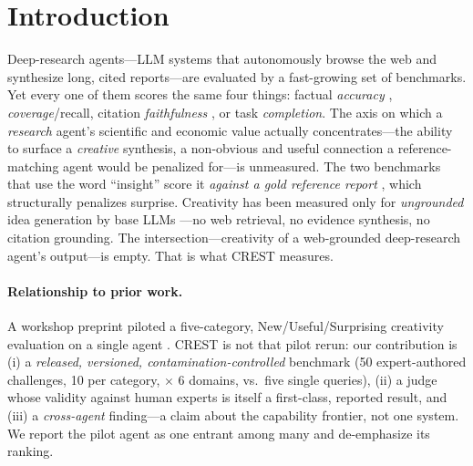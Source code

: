 \section{Introduction}

Deep-research agents---LLM systems that autonomously browse the web and synthesize long, cited reports---are evaluated by a fast-growing set of benchmarks. Yet every one of them scores the same four things: factual \emph{accuracy} \citep{mialon2023gaia,wei2025browsecomp}, \emph{coverage}/recall, citation \emph{faithfulness} \citep{du2025deepresearchbench}, or task \emph{completion}. The axis on which a \emph{research} agent's scientific and economic value actually concentrates---the ability to surface a \emph{creative} synthesis, a non-obvious and useful connection a reference-matching agent would be penalized for---is unmeasured. The two benchmarks that use the word ``insight'' score it \emph{against a gold reference report} \citep{du2025deepresearchbench,researcherbench2025}, which structurally penalizes surprise. Creativity has been measured only for \emph{ungrounded} idea generation by base LLMs \citep{si2024novel,ruan2024liveideabench}---no web retrieval, no evidence synthesis, no citation grounding. The intersection---creativity of a web-grounded deep-research agent's output---is empty. That is what \textsc{CREST} measures.

\paragraph{Relationship to prior work.} A workshop preprint piloted a five-category, New/Useful/Surprising creativity evaluation on a single agent \citep{caesar2026}. CREST is not that pilot rerun: our contribution is (i) a \emph{released, versioned, contamination-controlled} benchmark (50 expert-authored challenges, 10 per category, $\times$ 6 domains, vs.\ five single queries), (ii) a judge whose validity against human experts is itself a first-class, reported result, and (iii) a \emph{cross-agent} finding---a claim about the capability frontier, not one system. We report the pilot agent as one entrant among many and de-emphasize its ranking.


